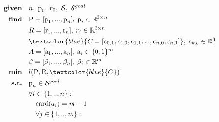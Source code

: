 \begin{align}
    \textrm{\textbf{given}} %
                            \quad & n, \; \mbox{p}_0, \; r_0, \; \mathcal{S}, \; \mathcal{S}^{goal} \nonumber\\
    \textrm{\textbf{find}}  \quad & \mbox{P}=[\mbox{p}_1,...,\mbox{p}_n], \; \mbox{p}_i \in \mathbb{R}^{3 \times n} \nonumber\\
                            \quad & R=[\mbox{r}_1,...,\mbox{r}_n], \; r_i \in \mathbb{R}^{3 \times n} \nonumber\\
                            \quad & \textcolor{blue}{C=[\mbox{c}_{0,1},c_{1,0},c_{1,1},...,c_{n,0},c_{n,1}]}, \; c_{k,e} \in \mathbb{R}^3 \nonumber\\
                            \quad & A=[\mbox{a}_1,...,\mbox{a}_n], \; \mbox{a}_i \in \{0,1\}^{m} \nonumber\\
                            \quad & \beta=[\beta_1,...,\beta_n], \; \beta_i \in \mathbb{R}^{m} \nonumber\\
    \textrm{\textbf{min}}  \quad & l(\mbox{P},\mbox{R},\textcolor{blue}{C}) \nonumber\\
    \textrm{\textbf{s.t.}}  \quad & \mbox{p}_n \in \mathcal{S}^{goal} \nonumber\\
                            \quad & \forall i \in \{1,..,n\} : \nonumber\\
                                \quad & \quad \mbox{card}(a_i) = m-1  \nonumber\\
                                \quad & \quad \forall j \in \{1,..,m\} : \nonumber\\

\end{align}
